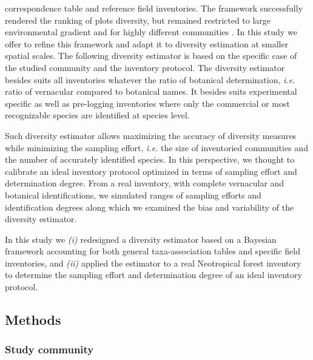 \documentclass[
  11pt,
  french,
  A4paper,
  extrafontsizes,onecolumn,openright
  ]{memoir}
\begin{document}
correspondence table \autocite{Molino2009} and reference field
inventories. The framework successfully rendered the ranking of plots
diversity, but remained restricted to large environmental gradient and
for highly different communities \autocites{Guitet2014b}{Guitet2013}. In
this study we offer to refine this framework and adapt it to diversity
estimation at smaller spatial scales. The following diversity estimator
is based on the specific case of the studied community and the inventory
protocol. The diversity estimator besides suits all inventories whatever
the ratio of botanical determination, \emph{i.e.} ratio of vernacular
compared to botanical names. It besides suits experimental specific as
well as pre-logging inventories where only the commercial or most
recognizable species are identified at species level.

Such diversity estimator allows maximizing the accuracy of diversity
measures while minimizing the sampling effort, \emph{i.e.} the size of
inventoried communities and the number of accurately identified species.
In this perspective, we thought to calibrate an ideal inventory protocol
optimized in terms of sampling effort and determination degree. From a
real inventory, with complete vernacular and botanical identifications,
we simulated ranges of sampling efforts and identification degrees along
which we examined the bias and variability of the diversity estimator.

In this study we \emph{(i)} redesigned a diversity estimator based on a
Bayesian framework accounting for both general taxa-association tables
and specific field inventories, and \emph{(ii)} applied the estimator to
a real Neotropical forest inventory to determine the sampling effort and
determination degree of an ideal inventory protocol.

\subsection{Methods}\label{methods}

\subsubsection{Study community}\label{study-community}
\end{document}
